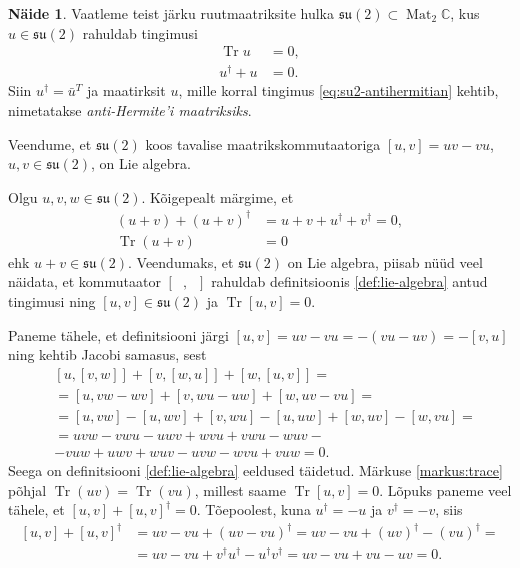 \documentclass[12pt,a4paper,oneside]{article}
\theoremstyle{plain}
\theoremstyle{definition}
\newtheorem{naide}{Näide}[section]
\numberwithin{equation}{section}
\def\C{{\mathbb C}}
\def\su2{{\mathfrak{ su}\left(2\right)}}
\DeclareMathOperator{\Mat}{Mat}
\DeclareMathOperator{\Tr}{Tr}
\begin{document}
\begin{naide} \label{naide:su2}
Vaatleme teist järku ruutmaatriksite hulka $\su2 \subset \Mat_2 \C$, 
kus $u \in \su2$ rahuldab tingimusi
\begin{align}
\Tr u &= 0, \label{eq:su2-tr=0}\\ 
u^\dagger + u &= 0. \label{eq:su2-antihermitian}
\end{align}
Siin $u^\dagger = \bar{u}^T$ ja maatirksit $u$, mille korral tingimus 
\ref{eq:su2-antihermitian} kehtib, nimetatakse \emph{anti-Hermite'i 
maatriksiks}.
 
Veendume, et $\su2$ koos tavalise maatrikskommutaatoriga 
$\left[u,v\right] = uv - vu$, $u, v \in \su2$, on Lie algebra.

Olgu $u, v, w \in \su2$. Kõigepealt märgime, et 
\begin{align*}
\left(u + v\right) + \left(u + v\right)^\dagger &= 
u + v + u^\dagger + v^\dagger = 0, \\
\Tr \left(u + v\right) &= 0
\end{align*}
ehk $u + v \in \su2$. Veendumaks, et $\su2$ on Lie algebra, piisab 
nüüd veel näidata, et kommutaator $\left[\phantom{u}, 
\phantom{u}\right]$ rahuldab definitsioonis \ref{def:lie-algebra} 
antud tingimusi ning $\left[u,v\right] \in \su2$ ja 
$\Tr \left[u,v\right] = 0$. 

Paneme tähele, et definitsiooni järgi $\left[u,v\right] = 
uv - vu = - \left(vu - uv\right) = - \left[v,u\right]$ ning 
kehtib Jacobi samasus, sest
\begin{align*}
&\left[u, \left[v, w\right]\right] + 
	\left[v, \left[w, u\right]\right] + 
	\left[w, \left[u, v\right]\right] = \\
&= \left[u, vw - wv \right] + 
	\left[v, wu - uw \right] + 
	\left[w, uv - vu \right] = \\
&= \left[u, vw\right] - \left[u, wv\right] + 
	\left[v, wu\right] - \left[u, uw\right] + 
	\left[w, uv\right] - \left[w, vu\right] = \\
&= uvw - vwu - uwv + wvu + vwu - wuv - \\
&- vuw + uwv + wuv - uvw - wvu + vuw = 0.
\end{align*}
Seega on definitsiooni \ref{def:lie-algebra} eeldused täidetud. 
Märkuse \ref{markus:trace} põhjal $\Tr \left(uv\right) = 
\Tr \left(vu\right)$, millest saame $\Tr \left[u,v\right] = 0$. 
Lõpuks paneme veel tähele, et $\left[u,v\right] + 
\left[u,v\right]^\dagger = 0$. Tõepoolest, kuna $u^\dagger = -u$ ja 
$v^\dagger = -v$, siis
\begin{align*}
\left[u,v\right] + \left[u,v\right]^\dagger &= uv - vu + 
\left(uv - vu\right)^\dagger = uv - vu + \left(uv\right)^\dagger - 
\left(vu\right)^\dagger = \\
&= uv - vu + v^\dagger u^\dagger - u^\dagger v^\dagger = 
uv - vu + vu - uv = 0.
\end{align*}
\end{naide}
\end{document}
